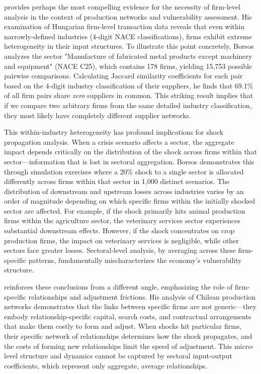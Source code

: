 \documentclass[final,1p,times,authoryear]{elsarticle}
\begin{document}
\cite{Borsos2021} provides perhaps the most compelling evidence for the necessity of firm-level analysis in the context of production networks and vulnerability assessment. His examination of Hungarian firm-level transaction data reveals that even within narrowly-defined industries (4-digit NACE classifications), firms exhibit extreme heterogeneity in their input structures. To illustrate this point concretely, Borsos analyzes the sector "Manufacture of fabricated metal products except machinery and equipment" (NACE C25), which contains 178 firms, yielding 15,753 possible pairwise comparisons. Calculating Jaccard similarity coefficients for each pair based on the 4-digit industry classification of their suppliers, he finds that 69.1\% of all firm pairs share \textit{zero} suppliers in common. This striking result implies that if we compare two arbitrary firms from the same detailed industry classification, they most likely have completely different supplier networks.

This within-industry heterogeneity has profound implications for shock propagation analysis. When a crisis scenario affects a sector, the aggregate impact depends critically on the distribution of the shock across firms within that sector—information that is lost in sectoral aggregation. Borsos demonstrates this through simulation exercises where a 20\% shock to a single sector is allocated differently across firms within that sector in 1,000 distinct scenarios. The distribution of downstream and upstream losses across industries varies by an order of magnitude depending on which specific firms within the initially shocked sector are affected. For example, if the shock primarily hits animal production firms within the agriculture sector, the veterinary services sector experiences substantial downstream effects. However, if the shock concentrates on crop production firms, the impact on veterinary services is negligible, while other sectors face greater losses. Sectoral-level analysis, by averaging across these firm-specific patterns, fundamentally mischaracterizes the economy's vulnerability structure.

\cite{Huneeus2018} reinforces these conclusions from a different angle, emphasizing the role of firm-specific relationships and adjustment frictions. His analysis of Chilean production networks demonstrates that the links between specific firms are not generic—they embody relationship-specific capital, search costs, and contractual arrangements that make them costly to form and adjust. When shocks hit particular firms, their specific network of relationships determines how the shock propagates, and the costs of forming new relationships limit the speed of adjustment. This micro-level structure and dynamics cannot be captured by sectoral input-output coefficients, which represent only aggregate, average relationships.
\end{document}
